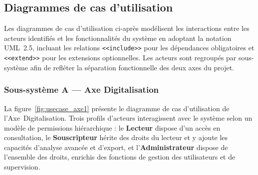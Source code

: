 \documentclass[../main.tex]{subfiles}
\begin{document}
\subsection{Diagrammes de cas d'utilisation}

Les diagrammes de cas d'utilisation ci-après modélisent les interactions entre les acteurs identifiés et les fonctionnalités du système en adoptant la notation UML~2.5, incluant les relations \texttt{<<include>>} pour les dépendances obligatoires et \texttt{<<extend>>} pour les extensions optionnelles. Les acteurs sont regroupés par sous-système afin de refléter la séparation fonctionnelle des deux axes du projet.

\subsubsection{Sous-système A --- Axe Digitalisation}

La figure~\ref{fig:usecase_axe1} présente le diagramme de cas d'utilisation de l'Axe~Digitalisation. Trois profils d'acteurs interagissent avec le système selon un modèle de permissions hiérarchique : le \textbf{Lecteur} dispose d'un accès en consultation, le \textbf{Souscripteur} hérite des droits du lecteur et y ajoute les capacités d'analyse avancée et d'export, et l'\textbf{Administrateur} dispose de l'ensemble des droits, enrichis des fonctions de gestion des utilisateurs et de supervision.
\end{document}
